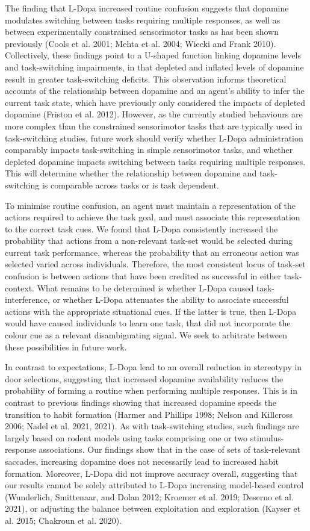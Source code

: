 \documentclass{article}
\begin{document}
The finding that L-Dopa increased routine confusion suggests that
dopamine modulates switching between tasks requiring multiple responses,
as well as between experimentally constrained sensorimotor tasks as has
been shown previously (Cools et al. 2001; Mehta et al. 2004; Wiecki and
Frank 2010). Collectively, these findings point to a U-shaped function
linking dopamine levels and task-switching impairments, in that depleted
and inflated levels of dopamine result in greater task-switching
deficits. This observation informs theoretical accounts of the
relationship between dopamine and an agent's ability to infer the
current task state, which have previously only considered the impacts of
depleted dopamine (Friston et al. 2012). However, as the currently
studied behaviours are more complex than the constrained sensorimotor
tasks that are typically used in task-switching studies, future work
should verify whether L-Dopa administration comparably impacts
task-switching in simple sensorimotor tasks, and whether depleted
dopamine impacts switching between tasks requiring multiple responses.
This will determine whether the relationship between dopamine and
task-switching is comparable across tasks or is task dependent.

To minimise routine confusion, an agent must maintain a representation
of the actions required to achieve the task goal, and must associate
this representation to the correct task cues. We found that L-Dopa
consistently increased the probability that actions from a non-relevant
task-set would be selected during current task performance, whereas the
probability that an erroneous action was selected varied across
individuals. Therefore, the most consistent locus of task-set confusion
is between actions that have been credited as successful in either
task-context. What remains to be determined is whether L-Dopa caused
task-interference, or whether L-Dopa attenuates the ability to associate
successful actions with the appropriate situational cues. If the latter
is true, then L-Dopa would have caused individuals to learn one task,
that did not incorporate the colour cue as a relevant disambiguating
signal. We seek to arbitrate between these possibilities in future work.

In contrast to expectations, L-Dopa lead to an overall reduction in
stereotypy in door selections, suggesting that increased dopamine
availability reduces the probability of forming a routine when
performing multiple responses. This is in contrast to previous findings
showing that increased dopamine speeds the transition to habit formation
(Harmer and Phillips 1998; Nelson and Killcross 2006; Nadel et al. 2021,
2021). As with task-switching studies, such findings are largely based
on rodent models using tasks comprising one or two stimulus-response
associations. Our findings show that in the case of sets of
task-relevant saccades, increasing dopamine does not necessarily lead to
increased habit formation. Moreover, L-Dopa did not improve accuracy
overall, suggesting that our results cannot be solely attributed to
L-Dopa increasing model-based control (Wunderlich, Smittenaar, and Dolan
2012; Kroemer et al. 2019; Deserno et al. 2021), or adjusting the
balance between exploitation and exploration (Kayser et al. 2015;
Chakroun et al. 2020).
\end{document}
